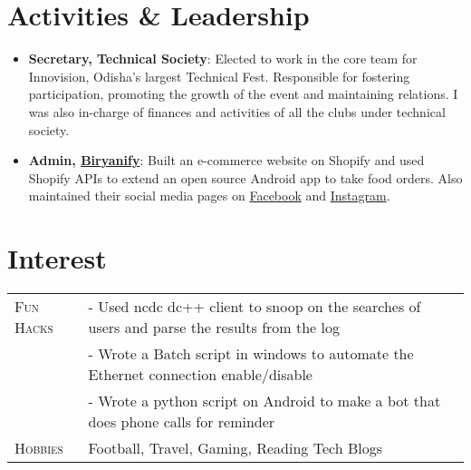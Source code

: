 \documentclass[a4paper,10pt]{extarticle} %
\begin{document}
\section{\textcolor{primary}{Activities \& Leadership}}

\begin{itemize}[leftmargin=0.55cm, rightmargin=0.2cm, label={\Large\textbullet}]
\item \textbf{Secretary, {Technical Society}}: 
Elected to work in the core team for Innovision, Odisha's largest Technical Fest. Responsible for fostering participation, promoting the growth of the event and maintaining relations. I was also in-charge of finances and activities of all the clubs under technical society.

\item \textbf{Admin, \href{https://www.biryanify.com}{Biryanify}}: Built an e-commerce website on Shopify and used Shopify APIs to extend an open source Android app to take food orders. Also maintained their social media pages on \href{https://www.facebook.com/biryanify}{Facebook} and \href{https://www.instagram.com/biryanify/}{Instagram}.
\end{itemize}

\vspace{-0.15cm}
\section{\textcolor{primary}{Interest}}
\begin{tabularx}{\linewidth}{ l | X }
\textsc{Fun Hacks} & {- Used ncdc dc++ client to snoop on the searches of users and parse the results from the log  }\\
& {- Wrote a Batch script in windows to automate the Ethernet connection enable/disable }\\
& {- Wrote a python script on Android to make a bot that does phone calls for reminder }\\

\textsc{Hobbies} & {Football, Travel, Gaming, Reading Tech Blogs}\\


\end{tabularx}

\end{document}
